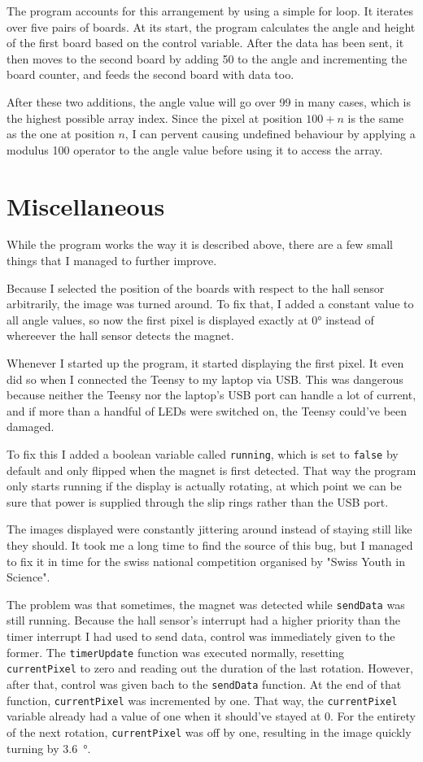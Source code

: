 \documentclass[a4paper, 11pt, titlepage]{report}
\begin{document}
The program accounts for this arrangement by using a simple for loop. It iterates over five pairs
of boards. At its start, the program calculates the angle and height of the first board based on
the control variable. After the data has been sent, it then moves to the second board by adding 50
to the angle and incrementing the board counter, and feeds the second board with data too.

After these two additions, the angle value will go over 99 in many cases, which is the highest
possible array index. Since the pixel at position $100+n$ is the same as the one at position $n$, I
can pervent causing undefined behaviour by applying a modulus 100 operator to the angle value
before using it to access the array.


\section{Miscellaneous}

While the program works the way it is described above, there are a few small things that I managed
to further improve.

Because I selected the position of the boards with respect to the hall sensor arbitrarily, the
image was turned around. To fix that, I added a constant value to all angle values, so now the
first pixel is displayed exactly at 0° instead of whereever the hall sensor detects the magnet.

Whenever I started up the program, it started displaying the first pixel. It even did so when I
connected the Teensy to my laptop via USB. This was dangerous because neither the Teensy nor the
laptop's USB port can handle a lot of current, and if more than a handful of LEDs were switched on,
the Teensy could've been damaged.

To fix this I added a boolean variable called \texttt{running}, which is set to \texttt{false} by
default and only flipped when the magnet is first detected. That way the program only starts
running if the display is actually rotating, at which point we can be sure that power is supplied
through the slip rings rather than the USB port.

The images displayed were constantly jittering around instead of staying still like they should. It
took me a long time to find the source of this bug, but I managed to fix it in time for the swiss
national competition organised by "Swiss Youth in Science".

The problem was that sometimes, the magnet was detected while \texttt{sendData} was still running.
Because the hall sensor's interrupt had a higher priority than the timer interrupt I had used to
send data, control was immediately given to the former. The \texttt{timerUpdate} function was
executed normally, resetting \texttt{currentPixel} to zero and reading out the duration of the last
rotation. However, after that, control was given bach to the \texttt{sendData} function. At the end
of that function, \texttt{currentPixel} was incremented by one. That way, the \texttt{currentPixel}
variable already had a value of one when it should've stayed at 0. For the entirety of the next
rotation, \texttt{currentPixel} was off by one, resulting in the image quickly turning by
\SI{3.6}{\degree}.
\end{document}
